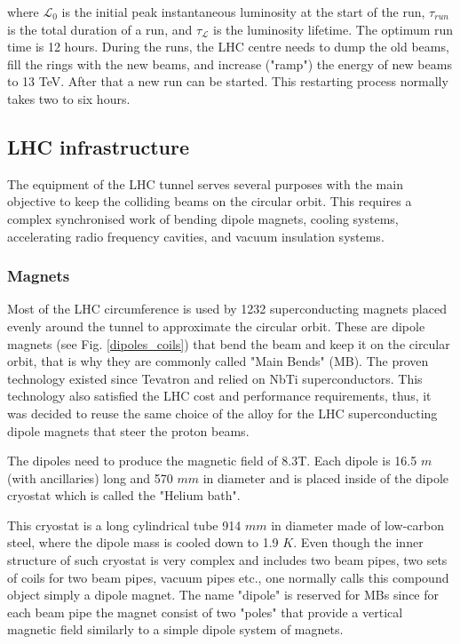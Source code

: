 \begin{normalsize}
\noindent where $\mathcal{L}_0$ is the initial peak instantaneous luminosity at the start of the run, $\tau_{run}$ is the total duration of a run, and $\tau_\mathcal{L}$ is the luminosity lifetime. The optimum run time is 12 hours. During the runs, the LHC centre needs to dump the old beams, fill the rings with the new beams, and increase ("ramp") the energy of new beams to 13 TeV. After that a new run can be started. This restarting process normally takes two to six hours.



\subsection{LHC infrastructure}

The equipment of the LHC tunnel serves several purposes with the main objective to keep the colliding beams on the circular orbit. This requires a complex synchronised work of bending dipole magnets, cooling systems, accelerating radio frequency cavities, and vacuum insulation systems.


\subsubsection{Magnets}\label{sec:magnets}

Most of the LHC circumference is used by 1232 superconducting magnets placed evenly around the tunnel to approximate the circular orbit. These are dipole magnets (see Fig. \ref{dipoles_coils}) that bend the beam and keep it on the circular orbit, that is why they are commonly called "Main Bends" (MB). The proven technology existed since Tevatron and relied on NbTi superconductors. This technology also satisfied the LHC cost and performance requirements, thus, it was decided to reuse the same choice of the alloy for the LHC superconducting dipole magnets that steer the proton beams. 

The dipoles need to produce the magnetic field of 8.3T. %
Each dipole is 16.5 $m$ (with ancillaries) long and 570 $mm$ in diameter and is placed inside of the dipole cryostat which is called the "Helium bath". 

This cryostat is a long cylindrical tube 914 $mm$ in diameter made of low-carbon steel, where the dipole mass is cooled down to 1.9 $K$. Even though the inner structure of such cryostat is very complex and includes two beam pipes, two sets of coils for two beam pipes, vacuum pipes etc., one normally calls this compound object simply a dipole magnet. The name "dipole" is reserved for MBs since for each beam pipe the magnet consist of two "poles" that provide a vertical magnetic field similarly to a simple dipole system of magnets. 


\end{normalsize}
